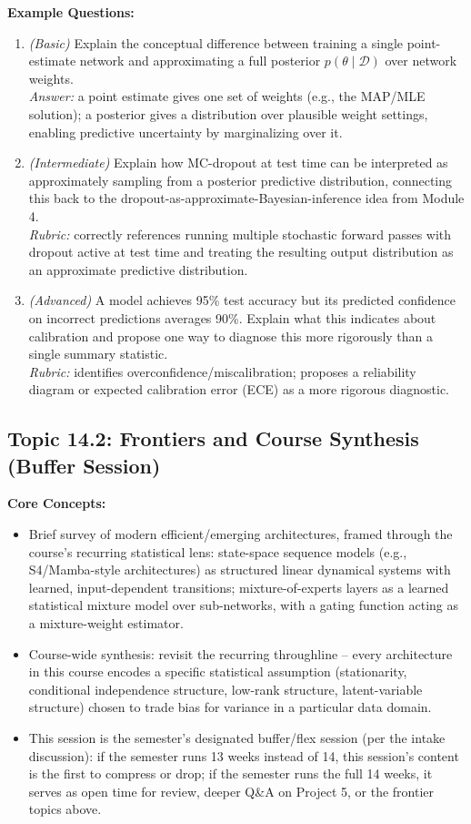 \documentclass[11pt]{article}
\begin{document}
\textbf{Example Questions:}
\begin{enumerate}
  \item \textit{(Basic)} Explain the conceptual difference between training a single point-estimate network and approximating a full posterior $p(\theta \mid \mathcal D)$ over network weights. \\
  \textit{Answer:} a point estimate gives one set of weights (e.g., the MAP/MLE solution); a posterior gives a distribution over plausible weight settings, enabling predictive uncertainty by marginalizing over it.
  \item \textit{(Intermediate)} Explain how MC-dropout at test time can be interpreted as approximately sampling from a posterior predictive distribution, connecting this back to the dropout-as-approximate-Bayesian-inference idea from Module 4. \\
  \textit{Rubric:} correctly references running multiple stochastic forward passes with dropout active at test time and treating the resulting output distribution as an approximate predictive distribution.
  \item \textit{(Advanced)} A model achieves 95\% test accuracy but its predicted confidence on incorrect predictions averages 90\%. Explain what this indicates about calibration and propose one way to diagnose this more rigorously than a single summary statistic. \\
  \textit{Rubric:} identifies overconfidence/miscalibration; proposes a reliability diagram or expected calibration error (ECE) as a more rigorous diagnostic.
\end{enumerate}

\subsection{Topic 14.2: Frontiers and Course Synthesis (Buffer Session)}

\textbf{Core Concepts:}
\begin{itemize}
  \item Brief survey of modern efficient/emerging architectures, framed through the course's recurring statistical lens: state-space sequence models (e.g., S4/Mamba-style architectures) as structured linear dynamical systems with learned, input-dependent transitions; mixture-of-experts layers as a learned statistical mixture model over sub-networks, with a gating function acting as a mixture-weight estimator.
  \item Course-wide synthesis: revisit the recurring throughline -- every architecture in this course encodes a specific statistical assumption (stationarity, conditional independence structure, low-rank structure, latent-variable structure) chosen to trade bias for variance in a particular data domain.
  \item This session is the semester's designated buffer/flex session (per the intake discussion): if the semester runs 13 weeks instead of 14, this session's content is the first to compress or drop; if the semester runs the full 14 weeks, it serves as open time for review, deeper Q\&A on Project 5, or the frontier topics above.
\end{itemize}
\end{document}
